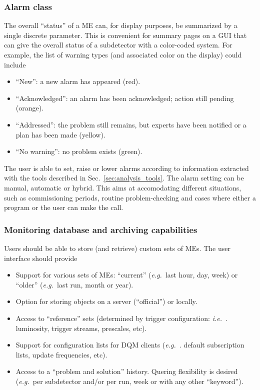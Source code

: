 \documentclass[a4paper]{cmspaper}
\newcommand {\ie}{\mbox{\sl i.e. }}     %
\newcommand {\eg}{\mbox{\sl e.g. }}     %
\begin{document}
\subsubsection{Alarm class}
\label{sec:alarm_class}
The overall ``status'' of a ME can, for display purposes, be
summarized by a single discrete parameter. This is convenient for
summary pages on a GUI that can give the overall status of a
subdetector with a color-coded system. For example, the list of
warning types (and associated color on the display) could include
\begin{itemize}
\item{``New'': a new alarm has appeared (red).}
\item{``Acknowledged'': an alarm has been acknowledged; action still pending
(orange).}
\item{``Addressed'': the problem still remains, but experts have been
notified or a plan has been made (yellow).}
\item{``No warning'': no problem exists (green).}
\end{itemize}
%
The user is able to set, raise or lower alarms according to
information extracted with the tools described in
Sec.~\ref{sec:analysis_tools}. The alarm setting can be manual,
automatic or hybrid. This aims at accomodating different situations,
such as commissioning periods, routine problem-checking and cases
where either a program or the user can make the call.
%
%
\subsubsection{Monitoring database and archiving capabilities}
\label{sec:monitoring_database}
Users should be able to store (and retrieve) custom sets of MEs. The
user interface should provide
\begin{itemize}
\item{Support for various sets of MEs: ``current'' (\eg last
hour, day, week) or ``older'' (\eg last run, month or year).} 
\item{Option for storing objects on a server (``official'') or
locally.}
\item{Access to ``reference'' sets (determined by trigger configuration:
\ie. luminosity, trigger streams, prescales, etc).}
\item{Support for configuration lists for DQM clients (\eg. default
subscription lists, update frequencies, etc).}
\item{Access to a ``problem and solution'' history. Quering flexibility is
desired (\eg per subdetector and/or per run, week or with
any other ``keyword'').}
\end{itemize}
%
%
\end{document}
